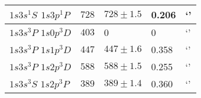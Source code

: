 \documentclass[10pt, twocolumn]{article}
\theoremstyle{definition}
\begin{document}
\begin{table}[ht!]
\begin{tabular}{p{}p{}p{}p{}p{}}
    \hline
    $1s3s{}^1\!S$ $1s3p{}^1\!P$ & $728$                                              & $728\pm1.5$                                       & 0.206   & `'              \\
    \hline
    $1s3s{}^3\!P$ $1s0p{}^3\!D$ & $403$                                              & 0                                                 & 0       & `'              \\
    \hline
    $1s3s{}^3\!P$ $1s1p{}^3\!D$ & $447$                                              & $447\pm1.6$                                       & 0.358   & `'              \\
    \hline
    $1s3s{}^3\!P$ $1s2p{}^3\!D$ & $588$                                              & $588\pm1.5$                                       & 0.255   & `'              \\
    \hline
    $1s3s{}^3\!S$ $1s2p{}^3\!P$ & $389$                                              & $389\pm1.4 $                                      & 0.360   & `'              \\
    \bottomrule
  \end{tabular}
\end{table}
\end{document}
